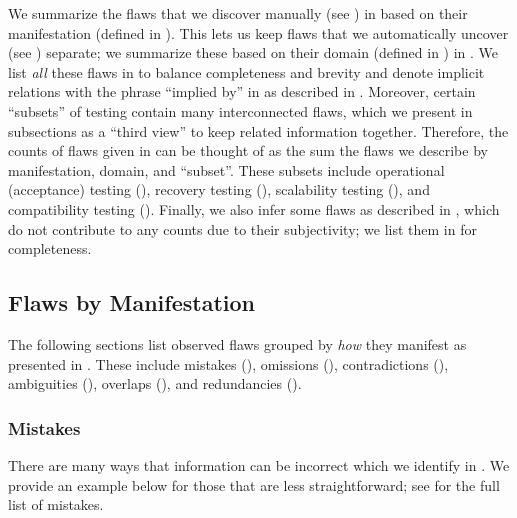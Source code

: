 We summarize the flaws that we discover manually \ifnotpaper (see
    ) \fi in  based on their
manifestation (defined in ). This lets us keep flaws that we
automatically uncover \ifnotpaper (see ) \fi separate;
we summarize these based on their domain (defined in ) in
.
\ifnotpaper We list \emph{all} these flaws in  to balance
    completeness and brevity and denote implicit relations with the phrase
    ``implied by'' in  as
    described in . \fi Moreover, certain ``subsets'' of
testing contain many interconnected flaws, which we present in subsections as a
``third view'' to keep related information together. Therefore, the counts of
flaws given in  can be thought of as the sum
the flaws we describe by manifestation, domain, and ``subset''. These subsets
include \ifnotpaper operational (acceptance) testing (), \fi
recovery testing (), scalability testing (),
and compatibility testing (). \ifnotpaper Finally, we also
    infer some flaws as described in , which do not contribute to
    any counts due to their subjectivity; we list them in 
    for completeness. \fi

\subsection{Flaws by Manifestation}\label{flawMnfsts}

The following sections list observed flaws grouped by \emph{how} they manifest
as presented in . These include mistakes (),
omissions (), contradictions (), ambiguities
(), overlaps (), and redundancies ().

\subsubsection{Mistakes}\label{wrong}

There are many ways that information can be incorrect which we identify in
. We provide an example below for those that are less
straightforward\ifnotpaper; see  for the full list of
mistakes\fi.



